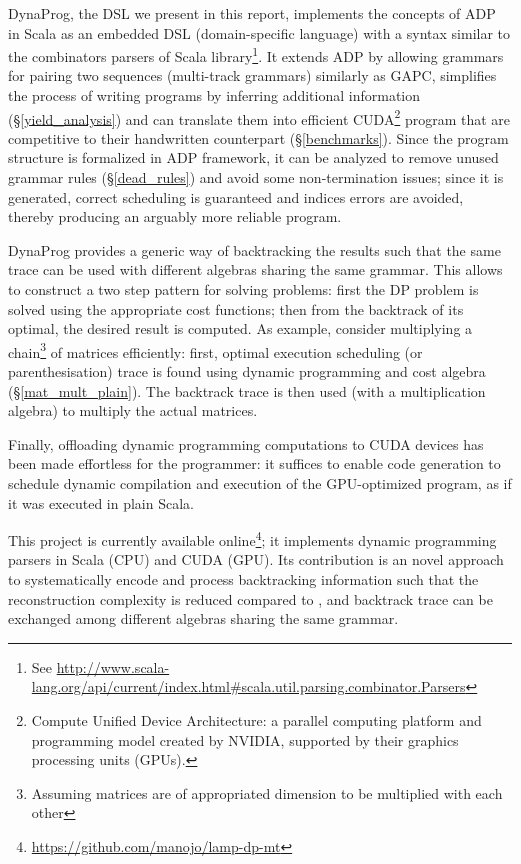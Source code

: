 DynaProg, the DSL we present in this report, implements the concepts of ADP in Scala as an embedded DSL (domain-specific language) with a syntax similar to the combinators parsers of Scala library\footnote{See \url{http://www.scala-lang.org/api/current/index.html\#scala.util.parsing.combinator.Parsers}}. It extends ADP by allowing grammars for pairing two sequences (multi-track grammars) similarly as GAPC\cite{gapc_thesis}, simplifies the process of writing programs by inferring additional information (\S\ref{yield_analysis}) and can translate them into efficient CUDA\footnote{Compute Unified Device Architecture: a parallel computing platform and programming model created by NVIDIA, supported by their graphics processing units (GPUs).} program that are competitive to their handwritten counterpart (\S\ref{benchmarks}). Since the program structure is formalized in ADP framework, it can be analyzed to remove unused grammar rules (\S\ref{dead_rules}) and avoid some non-termination issues; since it is generated, correct scheduling is guaranteed and indices errors are avoided, thereby producing an arguably more reliable program.

DynaProg provides a generic way of backtracking the results such that the same trace can be used with different algebras sharing the same grammar. This allows to construct a two step pattern for solving problems: first the DP problem is solved using the appropriate cost functions; then from the backtrack of its optimal, the desired result is computed. As example, consider multiplying a chain\footnote{Assuming matrices are of appropriated dimension to be multiplied with each other} of matrices efficiently: first, optimal execution scheduling (or parenthesisation) trace is found using dynamic programming and cost algebra (\S\ref{mat_mult_plain}). The backtrack trace is then used (with a multiplication algebra) to multiply the actual matrices.

Finally, offloading dynamic programming computations to CUDA devices has been made effortless for the programmer: it suffices to enable code generation to schedule dynamic compilation and execution of the GPU-optimized program, as if it was executed in plain Scala.

\newpage
This project is currently available online\footnote{\url{https://github.com/manojo/lamp-dp-mt}}; it implements dynamic programming parsers in Scala (CPU) and CUDA (GPU). Its contribution is an novel approach to systematically encode and process backtracking information such that the reconstruction complexity is reduced compared to \cite{gapc_thesis}, and backtrack trace can be exchanged among different algebras sharing the same grammar.

